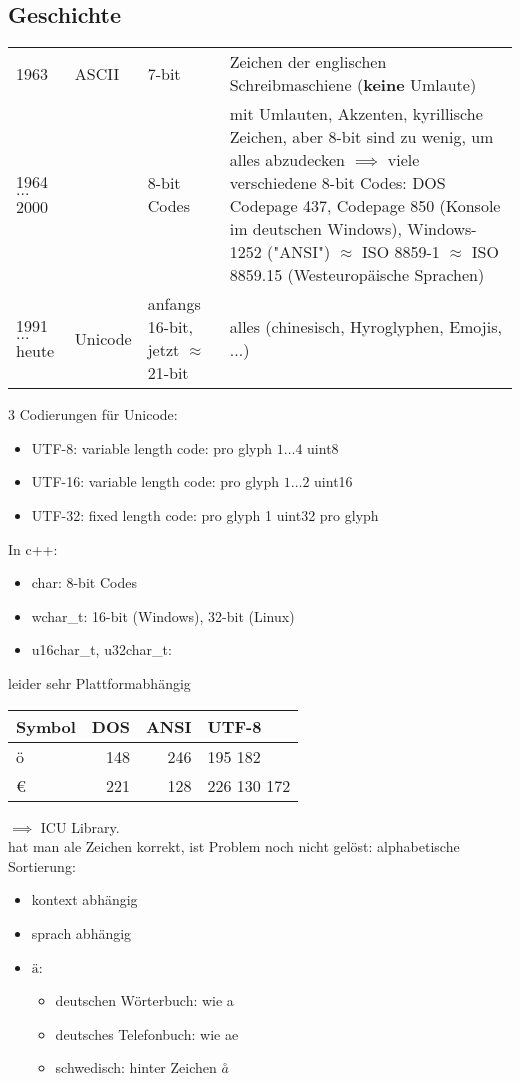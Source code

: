 \documentclass[a4paper]{scrartcl}
\theoremstyle{definition}
\theoremstyle{plain}
\theoremstyle{remark}
\theoremstyle{remark}
\begin{document}
\subsection{Geschichte}
\label{sec-17-1}
\begin{center}
\begin{tabular}{llll}
1963 & ASCII & 7-bit & Zeichen der englischen Schreibmaschiene (\textbf{keine} Umlaute)\\
1964 $\ldots$ 2000 &  & 8-bit Codes & mit Umlauten, Akzenten, kyrillische Zeichen, aber 8-bit sind zu wenig, um alles abzudecken $\implies$ viele verschiedene 8-bit Codes: DOS Codepage 437, Codepage 850 (Konsole im deutschen Windows), Windows-1252 ("ANSI") $\approx$ ISO 8859-1 $\approx$ ISO 8859.15 (Westeuropäische Sprachen)\\
1991 $\ldots$ heute & Unicode & anfangs 16-bit, jetzt $\approx$ 21-bit & alles (chinesisch, Hyroglyphen, Emojis, $\ldots$)\\
\end{tabular}
\end{center}
3 Codierungen für Unicode:
\begin{itemize}
\item UTF-8: variable length code: pro glyph $1 \ldots 4$ uint8
\item UTF-16: variable length code: pro glyph $1 \ldots 2$ uint16
\item UTF-32: fixed length code: pro glyph 1 uint32 pro glyph
\end{itemize}
In c++:
\begin{itemize}
\item char: 8-bit Codes
\item wchar\_t: 16-bit (Windows), 32-bit (Linux)
\item u16char\_t, u32char\_t:
\end{itemize}
leider sehr Plattformabhängig
\begin{center}
\begin{tabular}{lrrl}
Symbol & DOS & ANSI & UTF-8\\
\hline
ö & 148 & 246 & 195 182\\
€ & 221 & 128 & 226 130 172\\
\end{tabular}
\end{center}
$\implies$ ICU Library. \\
   hat man ale Zeichen korrekt, ist Problem noch nicht gelöst: alphabetische Sortierung:
\begin{itemize}
\item kontext abhängig
\item sprach abhängig
\item $ä$:
\begin{itemize}
\item deutschen Wörterbuch: wie a
\item deutsches Telefonbuch: wie ae
\item schwedisch: hinter Zeichen $\overset{\scriptstyle \circ}{a}$
\end{itemize}
\end{itemize}
\end{document}
